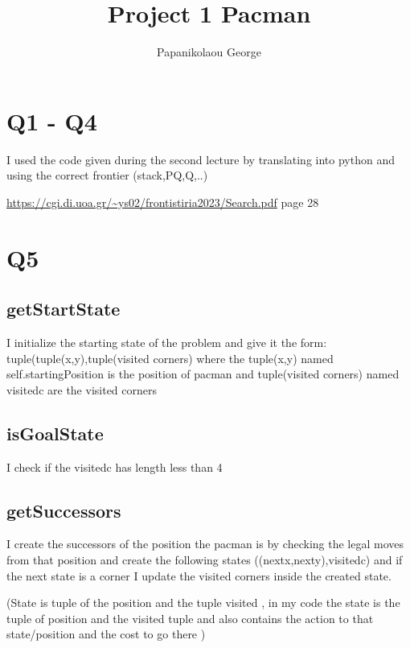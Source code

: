 \documentclass{article}
\title{Project 1 Pacman}
\author{Papanikolaou George}
\begin{document}
\maketitle

\section{Q1 - Q4}

I used the code given during the second lecture by translating into python and using the correct frontier (stack,PQ,Q,..)

\begin{center}
    
\url{https://cgi.di.uoa.gr/~ys02/frontistiria2023/Search.pdf}
 page 28
\end{center}
\section{Q5}

\subsection{getStartState}

I initialize the starting state of the problem and give it the form: tuple(tuple(x,y),tuple(visited corners) where the tuple(x,y) named self.startingPosition is the position of pacman and tuple(visited corners) named visited\textunderscore c are the visited corners

\subsection{isGoalState}

I check if the visited\textunderscore c has length less than 4 

\subsection{getSuccessors}

I create the successors of the position the pacman is by checking the legal moves from that position and create the following states ((nextx,nexty),visited\textunderscore c)
and if the next state is a corner I update the visited corners inside the created state.

(State is tuple of the position and the tuple visited , in my code the state is the tuple of position and the visited tuple and also contains the  action to that state/position and the cost to go there )
\end{document}
